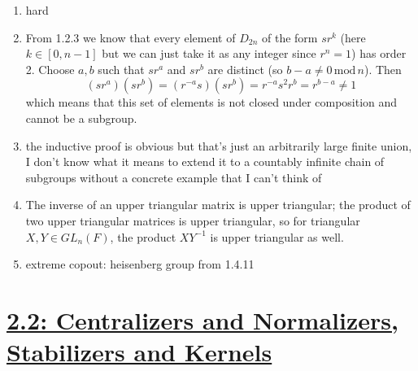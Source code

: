 \documentclass[]{article}
\newcommand{\md}{\,\text{mod}\,}
\begin{document}
\begin{enumerate}
\item {\color{red} hard}


\item From 1.2.3 we know that every element of $D_{2n}$ of the form $sr^k$ (here $k \in [0,n-1]$ but we can just take it as any integer since $r^n = 1$) has order 2. Choose $a,b$ such that $sr^a$ and $sr^b$ are distinct (so $b-a \neq 0 \md n$). Then
\begin{equation}
(sr^a)(sr^b) = (r^{-a}s)(sr^b) = r^{-a}s^2r^b = r^{b-a} \neq 1
\end{equation}
which means that this set of elements is not closed under composition and cannot be a subgroup.


\item {\color{red} the inductive proof is obvious but that's just an arbitrarily large finite union, I don't know what it means to extend it to a countably infinite chain of subgroups without a concrete example that I can't think of}


\item The inverse of an upper triangular matrix is upper triangular; the product of two upper triangular matrices is upper triangular, so for triangular $X,Y \in GL_n(F)$, the product $XY^{-1}$ is upper triangular as well.


\item extreme copout: heisenberg group from 1.4.11


\end{enumerate}











\section*{\underline{2.2: Centralizers and Normalizers, Stabilizers and Kernels}}
\end{document}
